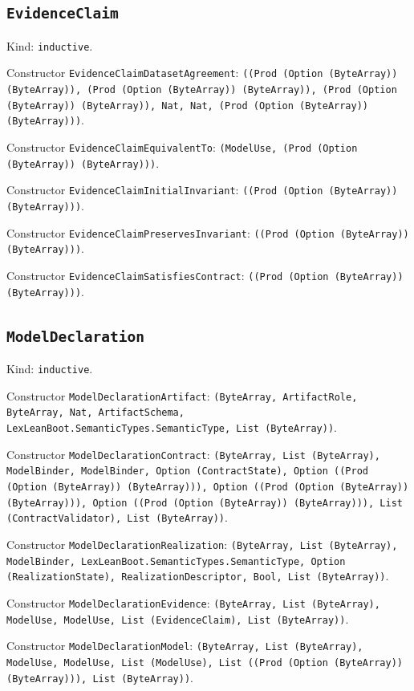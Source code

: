 \documentclass[11pt]{article}
\begin{document}
\subsection*{\texttt{EvidenceClaim}}
\noindent Kind: \texttt{inductive}.\par
\noindent Constructor \texttt{EvidenceClaimDatasetAgreement}: \texttt{((Prod (Option (ByteArray)) (ByteArray)), (Prod (Option (ByteArray)) (ByteArray)), (Prod (Option (ByteArray)) (ByteArray)), Nat, Nat, (Prod (Option (ByteArray)) (ByteArray)))}.\par
\noindent Constructor \texttt{EvidenceClaimEquivalentTo}: \texttt{(ModelUse, (Prod (Option (ByteArray)) (ByteArray)))}.\par
\noindent Constructor \texttt{EvidenceClaimInitialInvariant}: \texttt{((Prod (Option (ByteArray)) (ByteArray)))}.\par
\noindent Constructor \texttt{EvidenceClaimPreservesInvariant}: \texttt{((Prod (Option (ByteArray)) (ByteArray)))}.\par
\noindent Constructor \texttt{EvidenceClaimSatisfiesContract}: \texttt{((Prod (Option (ByteArray)) (ByteArray)))}.\par
\subsection*{\texttt{ModelDeclaration}}
\noindent Kind: \texttt{inductive}.\par
\noindent Constructor \texttt{ModelDeclarationArtifact}: \texttt{(ByteArray, ArtifactRole, ByteArray, Nat, ArtifactSchema, LexLeanBoot.SemanticTypes.SemanticType, List (ByteArray))}.\par
\noindent Constructor \texttt{ModelDeclarationContract}: \texttt{(ByteArray, List (ByteArray), ModelBinder, ModelBinder, Option (ContractState), Option ((Prod (Option (ByteArray)) (ByteArray))), Option ((Prod (Option (ByteArray)) (ByteArray))), Option ((Prod (Option (ByteArray)) (ByteArray))), List (ContractValidator), List (ByteArray))}.\par
\noindent Constructor \texttt{ModelDeclarationRealization}: \texttt{(ByteArray, List (ByteArray), ModelBinder, LexLeanBoot.SemanticTypes.SemanticType, Option (RealizationState), RealizationDescriptor, Bool, List (ByteArray))}.\par
\noindent Constructor \texttt{ModelDeclarationEvidence}: \texttt{(ByteArray, List (ByteArray), ModelUse, ModelUse, List (EvidenceClaim), List (ByteArray))}.\par
\noindent Constructor \texttt{ModelDeclarationModel}: \texttt{(ByteArray, List (ByteArray), ModelUse, ModelUse, List (ModelUse), List ((Prod (Option (ByteArray)) (ByteArray))), List (ByteArray))}.\par
\end{document}
